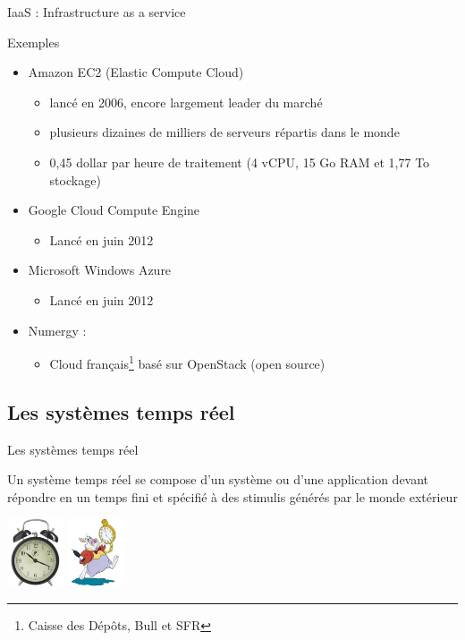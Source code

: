 \begin{frame}{IaaS : Infrastructure as a service}
\begin{exampleblock}{Exemples}
\begin{itemize}
\item Amazon EC2 (Elastic Compute Cloud)
\begin{itemize}
\item lancé en 2006, encore largement leader du marché
\item plusieurs dizaines de milliers de serveurs répartis dans le monde
\item 0,45 dollar par heure de traitement (4 vCPU, 15 Go RAM et 1,77 To stockage)
\end{itemize}

\item Google Cloud Compute Engine
\begin{itemize}
\item Lancé en juin 2012
\end{itemize}

\item Microsoft Windows Azure
\begin{itemize}
\item Lancé en juin 2012
\end{itemize}

\item Numergy : \begin{itemize}
\item Cloud français\footnote{Caisse des Dépôts, Bull et SFR} basé sur OpenStack (open source)
\end{itemize}

\end{itemize}
\end{exampleblock}
\end{frame}


\subsection{Les systèmes temps réel}
\begin{frame}{Les systèmes temps réel}
\begin{definition}
Un système temps réel se compose d'un système ou d'une application
devant répondre en un temps fini et spécifié à des stimulis générés
par le monde extérieur
\end{definition}
\includegraphics[height=2cm]{../illustration/reveil-ikea.jpg}
\includegraphics[height=2cm]{../illustration/lapin-alice-merveilles.png}
\end{frame}

